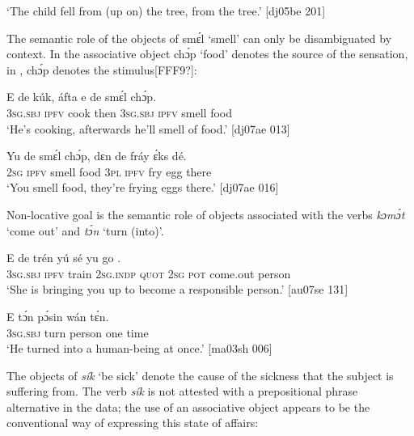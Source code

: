 \glt ‘The child fell from (up on) the tree, from the tree.’ [dj05be 201]
\z

The semantic role of the objects of smɛ́l ‘smell’ can only be disambiguated by context. In  the associative object chɔ́p ‘food’ denotes the source of the sensation, in , chɔ́p denotes the stimulus[FFF9?]: 


\ea%
    \label{ex:key:1185}
    \gll E    de  kúk,    áfta    e    de  smɛ́l  chɔ́p.\\
\textsc{3sg.sbj}  \textsc{ipfv}  cook  then  \textsc{3sg.sbj}  \textsc{ipfv}  smell  food\\

\glt ‘He’s cooking, afterwards he’ll smell of food.’ [dj07ae 013]
\z


\ea%
    \label{ex:key:1186}
    \gll Yu  de  smɛ́l  chɔ́p,  dɛn  de  fráy  ɛ́ks  dé.\\
\textsc{2sg}  \textsc{ipfv}  smell  food    \textsc{3pl}  \textsc{ipfv}  fry  egg  there\\

\glt ‘You smell food, they’re frying eggs there.’ [dj07ae 016]
\z

Non-locative goal is the semantic role of objects associated with the verbs \textit{kɔmɔ́t} ‘come out’ and \textit{tɔ́n} ‘turn (into)’. 


\ea%
    \label{ex:key:1187}
    \gll E    de  trén    yú    sé    yu  go      .\\
\textsc{3sg.sbj}  \textsc{ipfv}  train  \textsc{2sg.indp}  \textsc{quot}    \textsc{2sg}  \textsc{pot}  come.out  person\\

\glt ‘She is bringing you up to become a responsible person.’ [au07se 131]
\z


\ea%
    \label{ex:key:1188}
    \gll E    tɔ́n    pɔ́sin  wán    tɛ́n.\\
\textsc{3sg.sbj}  turn    person  one    time\\

\glt ‘He turned into a human-being at once.’ [ma03sh 006]
\z

The objects of \textit{sík} ‘be sick’ denote the cause of the sickness that the subject is suffering from. The verb \textit{sík} is not attested with a prepositional phrase alternative in the data; the use of an associative object appears to be the conventional way of expressing this state of affairs: 


